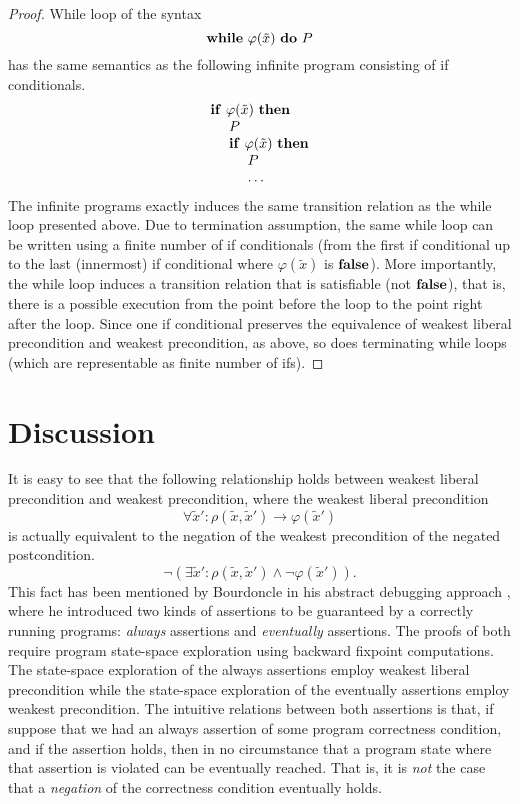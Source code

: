 \documentclass[times]{elsarticle}
\newcommand{\ptab}{~~~~}
\newcommand{\pif}{\mbox{\textbf{if}}}
\newcommand{\pthen}{\mbox{\textbf{then}}}
\newcommand{\pwhile}{\mbox{\textbf{while}}}
\newcommand{\pdo}{\mbox{\textbf{do}}}
\newcommand{\pfalse}{\mbox{\textbf{false}}}
\begin{document}
\begin{proof}
While loop of the syntax
\[
\pwhile ~\varphi(\tilde{x})~ \pdo ~P
\]
has the same semantics as the following infinite program consisting of
if conditionals.
\[
\begin{array}{l}
\pif ~\varphi(\tilde{x})~ \pthen\\
\ptab P\\
\ptab \pif ~\varphi(\tilde{x})~ \pthen\\
\ptab \ptab P\\
\ptab \ptab \ldots
\end{array}
\]
The infinite programs exactly induces the same transition relation as
the while loop presented above. Due to termination assumption, the
same while loop can be written using a finite number of if
conditionals (from the first if conditional up to the last (innermost)
if conditional where $\varphi(\tilde{x})$ is $\pfalse$). More importantly, the while
loop induces a transition relation that is satisfiable (not
$\pfalse$), that is, there is a possible execution from the point
before the loop to the point right after the loop. Since one if
conditional preserves the equivalence of weakest liberal precondition
and weakest precondition, as above, so does terminating while loops
(which are representable as finite number of ifs).
\end{proof}

\section{Discussion}
\label{sec:discussion}

It is easy to see that the following relationship holds between 
weakest liberal precondition and weakest precondition, where the 
weakest liberal precondition 
\[
\forall \tilde{x}' : \rho(\tilde{x},\tilde{x}') \rightarrow \varphi(\tilde{x}') 
\]
is actually equivalent to the negation of the weakest precondition of 
the negated postcondition. 
\[
\neg(\exists \tilde{x}' : \rho(\tilde{x},\tilde{x}') \wedge \neg\varphi(\tilde{x}')). 
\]
This fact has been mentioned by Bourdoncle in his abstract debugging 
approach \cite{bourdoncle93debug}, where he introduced two kinds of 
assertions to be guaranteed by a correctly running programs:
\emph{always\/} assertions and \emph{eventually\/} assertions. The 
proofs of both require program state-space exploration using backward 
fixpoint computations. The state-space exploration of the always 
assertions employ weakest liberal precondition while the state-space 
exploration of the eventually assertions employ weakest 
precondition. The intuitive relations between both assertions is that,
if suppose that we had an always assertion of some program correctness 
condition, and if the assertion holds, then in no circumstance that a 
program state where that assertion is violated can be eventually 
reached. That is, it is \emph{not\/} the case that a \emph{negation\/}
of the correctness condition eventually holds. 
\end{document}
